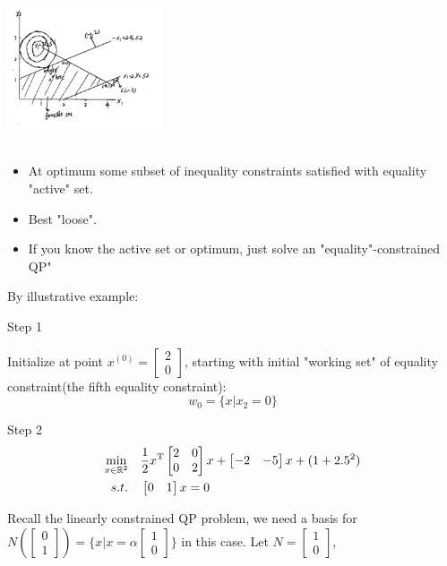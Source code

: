 \begin{marginfigure}
	\centering
	\includegraphics[width=1.8in,height=1.8in]{figures/ch07/figure1021_1.png}
\end{marginfigure}

\begin{itemize}
	\item At optimum some subset of inequality constraints satisfied with equality "active" set.
	
	\item Best "loose".
	
	\item If you know the active set or optimum, just solve an "equality"-constrained QP"
\end{itemize}
By illustrative example:

Step 1

Initialize at point $x^{(0)} = \begin{bmatrix}
2\\
0
\end{bmatrix}$, starting with initial "working set" of equality constraint(the fifth equality constraint):
$$w_0 = \{x|x_2 = 0 \}$$


Step 2
 \begin{align*}
\min_{x\in \mathbb{R}^2} \quad
&
\frac{1}{2}x^{{\rm T}}
\begin{bmatrix}
2&0\\
0&2
\end{bmatrix}
x + 
\begin{bmatrix}
-2 & -5
\end{bmatrix}x
+ (1 + 2.5^2)\\
s.t.\quad &
\begin{bmatrix}
0 & 1
\end{bmatrix}
x = 0
\end{align*}


Recall the linearly constrained QP problem, we need a basis for 
$N(\begin{bmatrix} 
0\\
1
\end{bmatrix}) 
= \{x|x = \alpha
\begin{bmatrix}
1\\
0
\end{bmatrix} \}$
in this case. Let
$N=
\begin{bmatrix}
1\\
0
\end{bmatrix}$,


